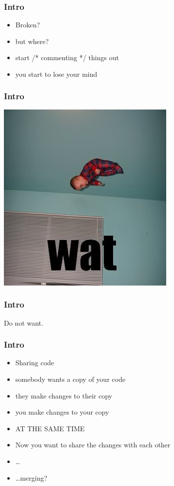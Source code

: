 \documentclass[%
        hyperref={%
                pdfauthor={Zakariyya Mughal},%
                pdfpagemode={None},pdfpagelayout={SinglePage}}%
        xcolor={x11names},%
]{beamer}
\begin{document}
\begin{frame}
\frametitle{Intro}
\begin{itemize}
\item[] Broken?
\pause \item[] \qquad but where?
\pause \item[] \qquad \qquad start /* commenting */ things out
\pause \item[] \qquad \qquad \qquad you start to lose your mind
\end{itemize}
\end{frame}

\begin{frame}
\frametitle{Intro}
\begin{center}
\includegraphics[height=0.85\textheight]{gfx/wat.jpg}
\end{center}
\end{frame}

\begin{frame}
\frametitle{Intro}
\begin{center}
\Huge
Do not want.
\end{center}
\end{frame}

\begin{frame}
\frametitle{Intro}
\begin{itemize}
\item[] Sharing code
\pause \item[] \qquad somebody wants a copy of your code
\pause \item[] \qquad \qquad they make changes to their copy
\pause \item[] \qquad \qquad you make changes to your copy
\pause \item[] \qquad \qquad AT THE SAME TIME
\pause \item[] \qquad Now you want to share the changes with each other
\pause \item[] \qquad \qquad \ldots
\pause \item[] \qquad \qquad \ldots merging?
\end{itemize}
\end{frame}
\end{document}
